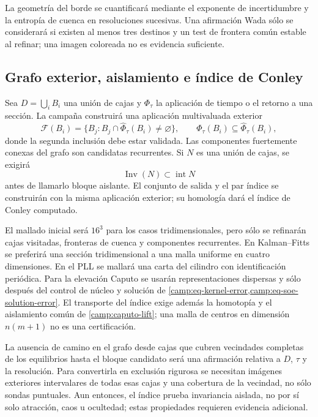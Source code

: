 La geometría del borde se cuantificará mediante el exponente de incertidumbre
y la entropía de cuenca en resoluciones sucesivas. Una afirmación Wada sólo se
considerará si existen al menos tres destinos y un test de frontera común
estable al refinar; una imagen coloreada no es evidencia suficiente.
\fi

\subsection{Grafo exterior, aislamiento e índice de Conley}
\label{camp:set-oriented}

Sea \(D=\bigcup_i B_i\) una unión de cajas y \(\Phi_\tau\) la aplicación de
tiempo o el retorno a una sección. La campaña construirá una aplicación
multivaluada exterior
\begin{equation}
 \mathcal F(B_i)=
 \{B_j:B_j\cap\widehat\Phi_\tau(B_i)\neq\varnothing\},
 \qquad
 \Phi_\tau(B_i)\subseteq\widehat\Phi_\tau(B_i),
 \label{camp:eq-outer-map}
\end{equation}
donde la segunda inclusión debe estar validada. Las componentes fuertemente
conexas del grafo son candidatas recurrentes. Si \(N\) es una unión de cajas,
se exigirá
\begin{equation}
 \operatorname{Inv}(N)\subset\operatorname{int}N
 \label{camp:eq-isolating-block}
\end{equation}
antes de llamarlo bloque aislante. El conjunto de salida y el par índice se
construirán con la misma aplicación exterior; su homología dará el índice de
Conley computado.

El mallado inicial será \(16^3\) para los casos tridimensionales, pero sólo se
refinarán cajas visitadas, fronteras de cuenca y componentes recurrentes. En
Kalman--Fitts se preferirá una sección tridimensional a una malla uniforme en
cuatro dimensiones. En el PLL se mallará una carta del cilindro con
identificación periódica. Para la elevación Caputo se usarán representaciones
dispersas y sólo después del control de núcleo y solución de
\cref{camp:eq-kernel-error,camp:eq-soe-solution-error}. El transporte del índice
exige además la homotopía y el aislamiento común de \cref{camp:caputo-lift};
una malla de centros en dimensión \(n(m+1)\) no es una certificación.

La ausencia de camino en el grafo desde cajas que cubren vecindades completas
de los equilibrios hasta el bloque candidato será una afirmación relativa a
\(D\), \(\tau\) y la resolución. Para convertirla en exclusión rigurosa se
necesitan imágenes exteriores intervalares de todas esas cajas y una cobertura
de la vecindad, no sólo sondas puntuales. Aun entonces, el índice prueba
invariancia aislada, no por sí solo atracción, caos u ocultedad; estas
propiedades requieren evidencia adicional.

